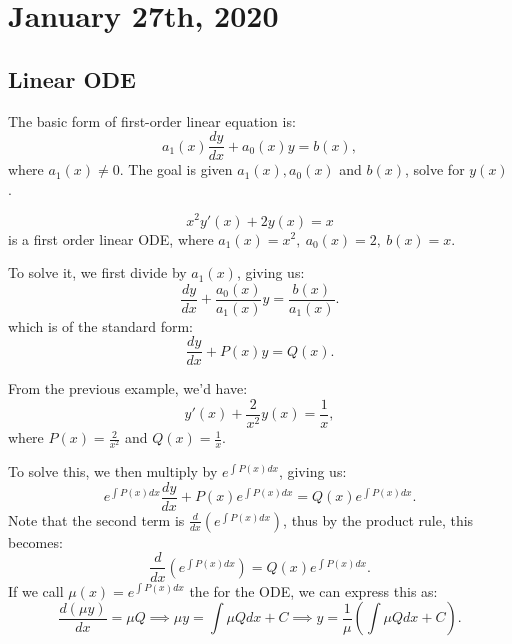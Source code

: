 \documentclass[../main/main.tex]{subfiles}
\begin{document}
\section{January 27th, 2020}
\subsection{Linear ODE}
\begin{definition}
	The basic form of first-order linear equation is: \[
	a_1(x) \frac{dy}{dx}+a_0(x)y=b(x)
,\] where $a_1(x)\neq 0$. The goal is given $a_1(x),a_0(x)$ and $b(x)$, solve for $y(x)$.
\end{definition}

\begin{example}
	 \[
		 x^2y'(x)+2y(x) = x
	 \] is a first order linear ODE, where $a_1(x) = x^2,\ a_0(x)=2,\ b(x) =x$. 
\end{example}

To solve it, we first divide by $a_1(x)$, giving us: \[
	\frac{dy}{dx}+ \frac{a_0(x)}{a_1(x)}y=\frac{b(x)}{a_1(x)}
.\] which is of the standard form: \[
\frac{dy}{dx}+P(x)y=Q(x)
.\] 
\begin{example}
	From the previous example, we'd have: \[
		y'(x)+\frac{2}{x^2}y(x)=\frac{1}{x}
	,\] where $P(x)=\frac{2}{x^2}$ and $Q(x) = \frac{1}{x}$. 
\end{example}
To solve this, we then multiply by $e^{\int P(x)dx}$, giving us: \[
	e^{\int P(x)dx} \frac{dy}{dx} + P(x) e^{\int P(x)dx} = Q(x) e^{\int P(x)dx}
.\] Note that the second term is $\frac{d}{dx}\left( e^{\int P(x)dx} \right) $, thus by the product rule, this becomes: \[
\frac{d}{dx}\left( e^{\int P(x) dx} \right) = Q(x) e^{\int P(x) dx} 
.\] If we call $\mu(x)=e^{\int P(x) dx}$ the  for the ODE, we can express this as: \[
\frac{d(\mu y)}{dx} = \mu Q \implies \mu y = \int \mu Q dx + C \implies y = \frac{1}{\mu}\left( \int \mu Q dx + C \right) 
.\] 
\end{document}
